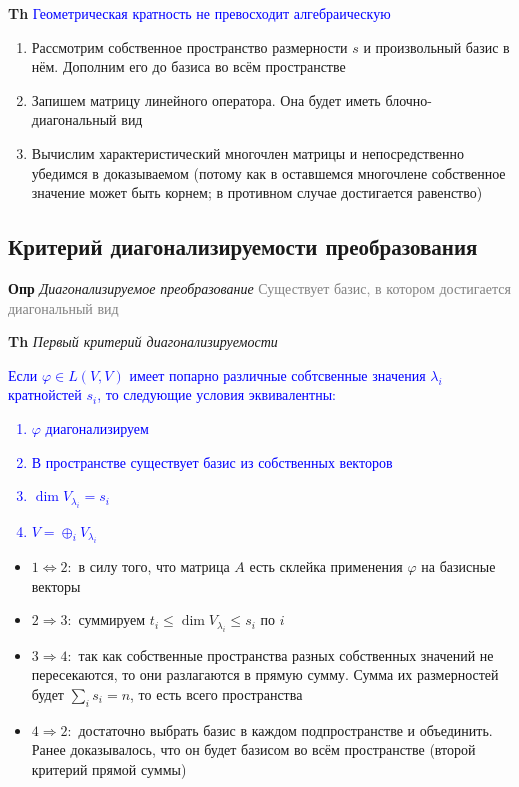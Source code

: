     \textbf{Th} \textcolor{blue}{Геометрическая кратность не превосходит алгебраическую}

    \begin{enumerate}
        \item Рассмотрим собственное пространство размерности $s$ и произвольный базис в нём.
        Дополним его до базиса во всём пространстве
        \item Запишем матрицу линейного оператора.
        Она будет иметь блочно-диагональный вид
        \item Вычислим характеристический многочлен матрицы и непосредственно убедимся в доказываемом (потому как в
        оставшемся многочлене собственное значение может быть корнем; в противном случае достигается
        равенство)
    \end{enumerate}

     \subsection{Критерий диагонализируемости преобразования}

    \textbf{Опр} \textit{Диагонализируемое преобразование} \textcolor{gray}{Существует базис, в котором достигается
    диагональный вид}

    \textbf{Th} \textit{Первый критерий диагонализируемости}

    \textcolor{blue}{Если $\varphi \in L(V, V)$ имеет попарно различные собтсвенные значения $\lambda_i$
        кратнойстей $s_i$, то следующие условия эквивалентны:
    \begin{enumerate}
        \item $\varphi$ диагонализируем
        \item В пространстве существует базис из собственных векторов
        \item $\dim V_{\lambda_i} = s_i$
        \item $V = \oplus_i V_{\lambda_i}$
    \end{enumerate}             }

\begin{itemize}
    \item $1 \Leftrightarrow 2:$ в силу того, что матрица $A$ есть склейка применения $\varphi$ на базисные векторы
    \item $2 \Rightarrow 3:$ суммируем $t_i \leq \dim V_{\lambda_i} \leq s_i$ по $i$
    \item $3 \Rightarrow 4:$ так как собственные пространства разных собственных значений не пересекаются, то они
    разлагаются в прямую сумму.
    Сумма их размерностей будет $\sum_i s_i = n$, то есть всего пространства
    \item $4 \Rightarrow 2:$ достаточно выбрать базис в каждом подпространстве и объединить.
    Ранее доказывалось, что он будет базисом во всём пространстве (второй критерий прямой суммы)
\end{itemize}

